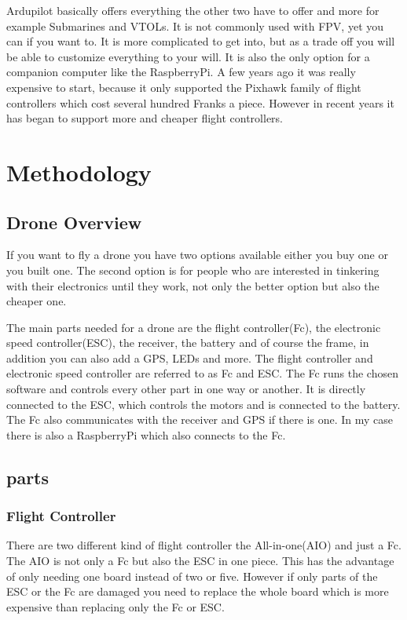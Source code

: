 \documentclass{article}
\begin{document}
	Ardupilot basically offers everything the other two have to offer and more for example Submarines and VTOLs. It is not commonly used with FPV, yet you can if you want to. It is more complicated to get into, but as a trade off you will be able to customize everything to your will. It is also the only option for a companion computer like the RaspberryPi. A few years ago it was really expensive to start, because it only supported the Pixhawk family of flight controllers which cost several hundred Franks a piece. However in recent years it has began to support more and cheaper flight controllers.
	
	
	
	
	
	
	\section{Methodology}
	\subsection{Drone Overview}
	If you want to fly a drone you have two options available either you buy one or you built one. The second option is for people who are interested in tinkering with their electronics until they work, not only the better option but also the cheaper one.
	
	The main parts needed for a drone are the flight controller(Fc), the electronic speed controller(ESC), the receiver, the battery and of course the frame, in addition you can also add a GPS, LEDs and more. The flight controller and electronic speed controller are referred to as Fc and ESC. The Fc runs the chosen software and controls every other part in one way or another. It is directly connected to the ESC, which controls the motors and is connected to the battery. The Fc also communicates with the receiver and GPS if there is one. In my case there is also a RaspberryPi which also connects to the Fc.
	  
	\subsection{parts}
	
	\subsubsection[Fc]{Flight Controller}
	There are two different kind of flight controller the All-in-one(AIO) and just a Fc. The AIO is not only a Fc but also the ESC in one piece. This has the advantage of only needing one board instead of two or five. However if only parts of the ESC or the Fc are damaged you need to replace the whole board which is more expensive than replacing only the Fc or ESC. 
	
\end{document}
